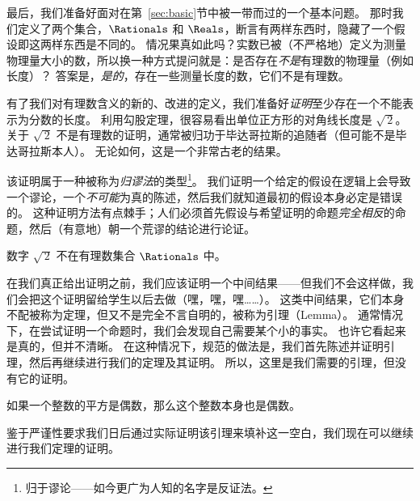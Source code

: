 \vspace{.2in}


最后，我们准备好面对在第~\ref{sec:basic}节中被一带而过的一个基本问题。
那时我们定义了两个集合，$\Rationals$ 和 $\Reals$，断言有两样东西时，隐藏了一个假设即这两样东西是不同的。
情况果真如此吗？实数已被（不严格地）定义为测量物理量大小的数，所以换一种方式提问就是：是否存在{\em 不是}有理数的物理量（例如长度）？
答案是，{\em 是的}，存在一些测量长度的数，它们不是有理数。

有了我们对有理数含义的新的、改进的定义，我们准备好{\em 证明}至少存在一个不能表示为分数的长度。
利用勾股定理，很容易看出单位正方形的对角线长度是 $\sqrt{\,2}$。
关于 $\sqrt{\,2}$ 不是有理数的证明，通常被归功于毕达哥拉斯的追随者（但可能不是毕达哥拉斯本人）。
无论如何，这是一个非常古老的结果。

该证明属于一种被称为\emph{归谬法}的类型\footnote{归于谬论——如今更广为人知的名字是反证法。}。
我们证明一个给定的假设在逻辑上会导致一个谬论，一个{\em 不可能}为真的陈述，然后我们就知道最初的假设本身必定是错误的。
这种证明方法有点棘手；人们必须首先假设与希望证明的命题\emph{完全相反}的命题，然后（有意地）朝一个荒谬的结论进行论证。

\begin{thm}
  数字 $\sqrt{\,2}$ 不在有理数集合 $\Rationals$ 中。
\end{thm}

在我们真正给出证明之前，我们应该证明一个中间结果——但我们不会这样做，我们会把这个证明留给学生以后去做（嘿，嘿，嘿……）。
这类中间结果，它们本身不配被称为定理，但又不是完全不言自明的，被称为引理（Lemma）。
通常情况下，在尝试证明一个命题时，我们会发现自己需要某个小的事实。
也许它看起来是真的，但并不清晰。
在这种情况下，规范的做法是，我们首先陈述并证明引理，然后再继续进行我们的定理及其证明。
所以，这里是我们需要的引理，但没有它的证明。

\begin{lem}
  如果一个整数的平方是偶数，那么这个整数本身也是偶数。
\end{lem}

鉴于严谨性要求我们日后通过实际证明该引理来填补这一空白，我们现在可以继续进行我们定理的证明。

